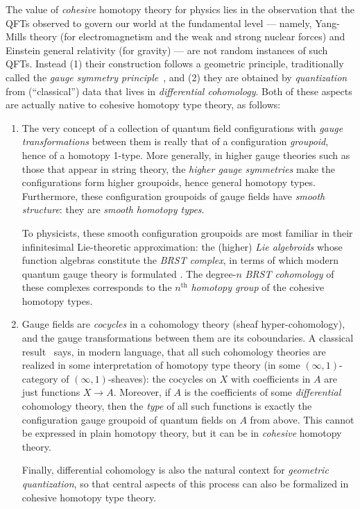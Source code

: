 \documentclass[copyright,12pt]{eptcs}
\begin{document}
The value of \emph{cohesive} homotopy theory for physics lies in the observation that
the QFTs observed to
govern our world at the fundamental level --- namely,
Yang-Mills theory (for electromagnetism and the weak and strong nuclear forces)
and Einstein general relativity (for gravity) --- are not random
instances of such QFTs.
Instead
(1) their construction follows a geometric principle,
traditionally called the \emph{gauge symmetry principle}~\cite{RS},
and (2) they are obtained by \emph{quantization} from
(``classical'') data that lives in \emph{differential cohomology}.
Both of these aspects are actually native to cohesive homotopy type theory, as follows:
\begin{enumerate}[leftmargin=*]
\item The very concept of a collection of quantum field configurations
with \emph{gauge transformations} between them
is really that of a configuration \emph{groupoid}, hence of a homotopy 1-type.
More generally, in higher gauge theories such as those that appear in string theory, the
\emph{higher gauge symmetries} make the configurations form higher groupoids, hence general
homotopy types.
Furthermore,  these configuration groupoids of gauge fields have
\emph{smooth structure}: they are \emph{smooth homotopy types}.

To physicists, these smooth configuration groupoids
are most familiar in their infinitesimal Lie-theoretic
approximation: the (higher) \emph{Lie algebroids} whose function algebras
constitute the \emph{BRST complex}, in terms of which modern quantum gauge theory is
formulated \cite{HT}. The degree-$n$
\emph{BRST cohomology} of these complexes
corresponds to the $n^{\mathrm{th}}$ \emph{homotopy group} of the cohesive homotopy types.
\item Gauge fields are \emph{cocycles} in a cohomology theory
(sheaf hyper-cohomology), and the
gauge transformations
between them are its %
coboundaries.
A classical result~\cite{Brown} says, in modern language,
that all such cohomology theories are realized in some interpretation of
homotopy type theory (in some $(\infty,1)$-category of $(\infty,1)$-sheaves):
the cocycles on $X$ with coefficients in $A$ are just functions $X \to A$.
Moreover, if $A$ is the coefficients of some \emph{differential} cohomology theory, then the \emph{type} of all such functions is exactly the configuration gauge groupoid of quantum fields on $A$ from above.
This cannot be expressed in plain homotopy theory, but it can be in \emph{cohesive} homotopy theory.

Finally, differential cohomology is also the natural context for
\emph{geometric quantization}, so that central aspects of this process can also be formalized in
cohesive homotopy type theory.
\end{enumerate}
\end{document}
